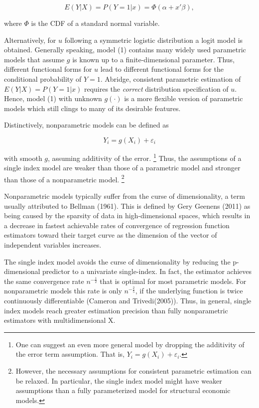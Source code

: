 \documentclass[a4paper]{article}
\begin{document}
\[
E(Y|X) = P(Y=1|x) = \Phi(\alpha + x'\beta),
\]

where $\Phi$ is the CDF of a standard normal variable. 

Alternatively, for $u$ following a symmetric logistic distribution a logit model is obtained. Generally speaking, model (1) contains many widely used parametric models that assume $g$ is known up to a finite-dimensional parameter. Thus, different functional forms for $u$ lead to different functional forms for the conditional probability of $Y = 1$. Abridge, consistent parametric estimation of $E(Y|X) = P(Y=1|x)$ requires the \textit{correct} distribution specification of $u$. 
Hence, model (1) with unknown $g(\cdot)$ is a more flexible version of parametric models which still clings to many of its desirable features. 

Distinctively, nonparametric models can be defined as
  
\[Y_i = g(X_i) + \varepsilon_i\]

with smooth $g$, assuming additivity of the error. \footnote{One can suggest an even more general model by dropping the additivity of the error term assumption. That is, $Y_i = g(X_i) + \varepsilon_i$. } Thus, the assumptions of a single index model are weaker than those of a parametric model and stronger than those of a nonparametric model.  \footnote{However, the necessary assumptions for consistent parametric estimation can be relaxed. In particular, the single index model might have weaker assumptions than a fully parameterized model for structural economic models.} 

Nonparametric models typically suffer from the curse of dimensionality, a term usually attributed to Bellman (1961). This is defined by Gery Geenens (2011) as being caused by the sparsity of data in high-dimensional spaces, which results in a decrease in fastest achievable rates of convergence of regression function estimators toward their target curve as the dimension of the vector of independent variables increases. 

The single index model avoids the curse of dimensionality by reducing the p-dimensional predictor to a univariate single-index. In fact, the estimator achieves the same convergence rate $n^{-\frac{1}{2}}$ that is optimal for most parametric models. For nonparametric models this rate is only $n^{-\frac{2}{5}}$, if the underlying function is twice continuously differentiable (Cameron and Trivedi(2005)).
Thus, in general, single index models reach greater estimation precision than fully nonparametric estimators with multidimensional X.
\end{document}
